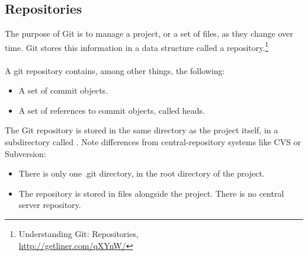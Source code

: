 
\newpage
\subsection{Repositories}
The purpose of Git is to manage a project, or a set of files, as
they change over time.  Git stores this information in a data
structure called a repository.\footnote{Understanding Git: Repositories,\\
\href{http://getliner.com/qXYnW/}{http://getliner.com/qXYnW/}}
\\
\\
A git repository contains, among other things, the following:

\begin{itemize}
  \item{A set of commit objects.}
  \item{A set of references to commit objects, called heads.}
\end{itemize}

\noindent The Git repository is stored in the same directory as
the project itself, in a subdirectory called .  Note
differences from central-repository systems like CVS or
Subversion:

\begin{itemize}
  \item{There is only one .git directory,
        in the root directory of the project.}
  \item{The repository is stored in files alongside the project.
        There is no central server repository.}
\end{itemize}
